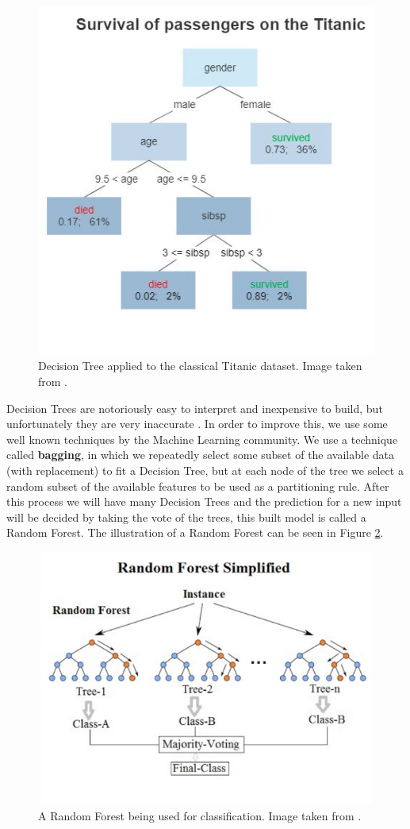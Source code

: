 \begin{figure}[H]
    \includegraphics[width=.7\textwidth]{Cap2-Methods/Decision_Tree.jpg}
    \centering
	\caption{Decision Tree applied to the classical Titanic dataset. Image taken from \cite{decisionimg}.}
	\label{decision}
\end{figure}

Decision Trees are notoriously easy to interpret and inexpensive to build, but unfortunately they are very inaccurate \cite{elements}. In order to improve this, we use some well known techniques by the Machine Learning community. We use a technique called \textbf{bagging}, in which we repeatedly select some subset of the available data (with replacement) to fit a Decision Tree, but at each node of the tree we select a random subset of the available features to be used as a partitioning rule. After this process we will have many Decision Trees and the prediction for a new input will be decided by taking the vote of the trees, this built model is called a Random Forest. The illustration of a Random Forest can be seen in Figure \ref{random}. 

\begin{figure}[H]
    \includegraphics[width=\textwidth]{Cap2-Methods/Random_forest_diagram_complete.png}
    \centering
	\caption{A Random Forest being used for classification. Image taken from \cite{randomimg}.}
	\label{random}
\end{figure}

